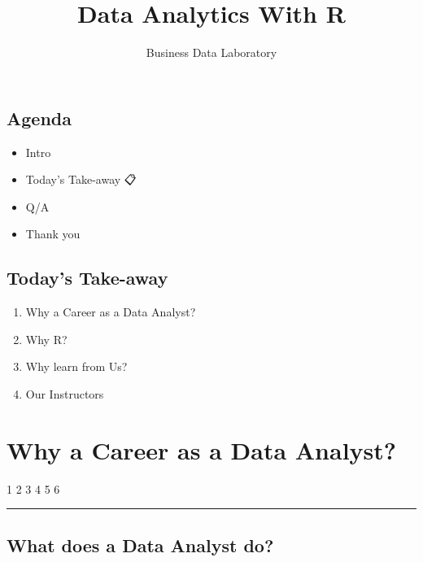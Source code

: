 \documentclass[
  letterpaper,
  DIV=11,
  numbers=noendperiod]{scrartcl}
\title{Data Analytics With R}
\author{Business Data Laboratory}
\date{}
\providecommand{\tightlist}{%
  \setlength{\itemsep}{0pt}\setlength{\parskip}{0pt}}\usepackage{longtable,booktabs,array}
\begin{document}
\maketitle
\ifdefined\Shaded\renewenvironment{Shaded}{\begin{tcolorbox}[frame hidden, boxrule=0pt, sharp corners, borderline west={3pt}{0pt}{shadecolor}, interior hidden, enhanced, breakable]}{\end{tcolorbox}}\fi

\hypertarget{agenda}{%
\subsection{Agenda}\label{agenda}}

\begin{itemize}
\item
  Intro {👋}
\item
  Today's Take-away {📋}
\item
  Q/A
\item
  Thank you
\end{itemize}

\hypertarget{todays-take-away}{%
\subsection{Today's Take-away}\label{todays-take-away}}

\begin{enumerate}
\def\labelenumi{\arabic{enumi}.}
\tightlist
\item
  Why a Career as a Data Analyst?
\item
  Why R?
\item
  Why learn from Us?
\item
  Our Instructors
\end{enumerate}

\hypertarget{why-a-career-as-a-data-analyst}{%
\section{Why a Career as a Data
Analyst?}\label{why-a-career-as-a-data-analyst}}

1 {2 3 4 5 6}

\begin{center}\rule{0.5\linewidth}{0.5pt}\end{center}

\hypertarget{what-does-a-data-analyst-do}{%
\subsection{What does a Data Analyst
do?}\label{what-does-a-data-analyst-do}}
\end{document}
